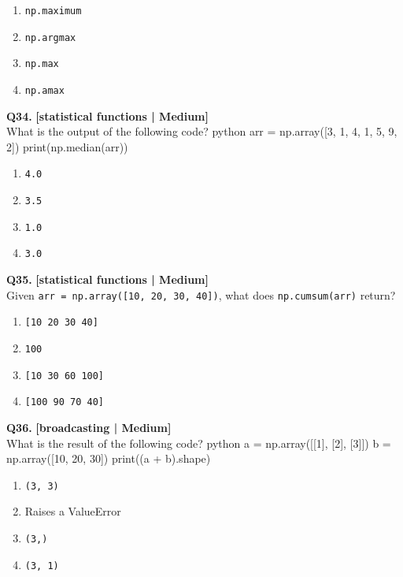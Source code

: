 \begin{enumerate}[label=(\alph*),topsep=2pt,itemsep=1pt,partopsep=0pt,parsep=0pt]
    \item \relax \texttt{np.maximum}
    \item \relax \texttt{np.argmax}
    \item \relax \texttt{np.max}
    \item \relax \texttt{np.amax}
\end{enumerate}
\vspace{2mm}

\noindent\textbf{Q34.} \hfill {\small\color{LPUOrange}\textbf{[statistical functions | Medium]}}\\[2pt]
What is the output of the following code? 
 python 
 arr = np.array([3, 1, 4, 1, 5, 9, 2]) 
 print(np.median(arr))

\begin{enumerate}[label=(\alph*),topsep=2pt,itemsep=1pt,partopsep=0pt,parsep=0pt]
    \item \relax \texttt{4.0}
    \item \relax \texttt{3.5}
    \item \relax \texttt{1.0}
    \item \relax \texttt{3.0}
\end{enumerate}
\vspace{2mm}

\noindent\textbf{Q35.} \hfill {\small\color{LPUOrange}\textbf{[statistical functions | Medium]}}\\[2pt]
Given \texttt{arr = np.array([10, 20, 30, 40])}, what does \texttt{np.cumsum(arr)} return?

\begin{enumerate}[label=(\alph*),topsep=2pt,itemsep=1pt,partopsep=0pt,parsep=0pt]
    \item \relax \texttt{[10 20 30 40]}
    \item \relax \texttt{100}
    \item \relax \texttt{[10 30 60 100]}
    \item \relax \texttt{[100 90 70 40]}
\end{enumerate}
\vspace{2mm}

\noindent\textbf{Q36.} \hfill {\small\color{LPUOrange}\textbf{[broadcasting | Medium]}}\\[2pt]
What is the result of the following code? 
 python 
 a = np.array([[1], [2], [3]]) 
 b = np.array([10, 20, 30]) 
 print((a + b).shape)

\begin{enumerate}[label=(\alph*),topsep=2pt,itemsep=1pt,partopsep=0pt,parsep=0pt]
    \item \relax \texttt{(3, 3)}
    \item \relax Raises a ValueError
    \item \relax \texttt{(3,)}
    \item \relax \texttt{(3, 1)}
\end{enumerate}
\vspace{2mm}

